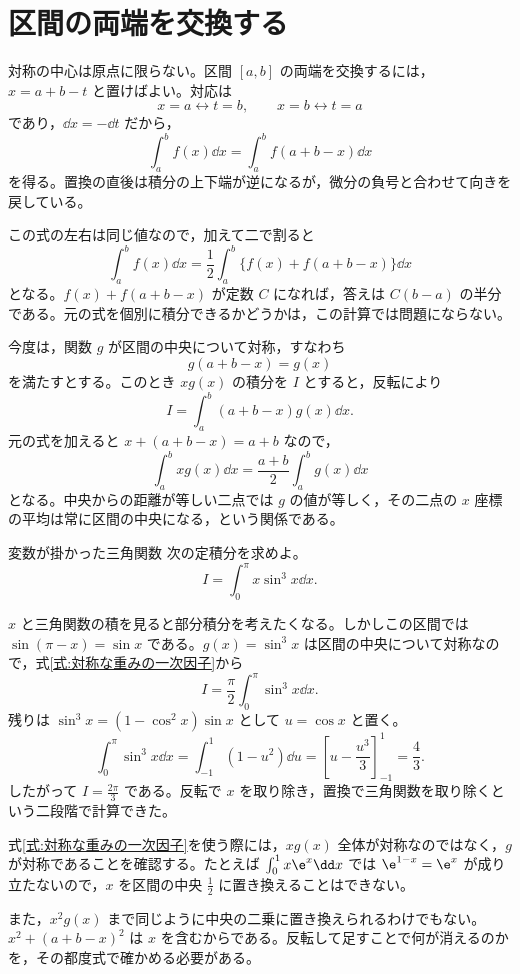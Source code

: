 \section{区間の両端を交換する}\label{節:区間の反転}

対称の中心は原点に限らない。区間 $[a,b]$ の両端を交換するには，$x=a+b-t$ と置けばよい。対応は
\[
x=a\longleftrightarrow t=b,\qquad
x=b\longleftrightarrow t=a
\]
であり，$\dd x=-\dd t$ だから，
\begin{equation}\label{式:区間反転}
\int_a^b f(x)\dd x=\int_a^b f(a+b-x)\dd x
\end{equation}
を得る。置換の直後は積分の上下端が逆になるが，微分の負号と合わせて向きを戻している。

この式の左右は同じ値なので，加えて二で割ると
\begin{equation}\label{式:反転平均}
\int_a^b f(x)\dd x
 =\frac12\int_a^b\{f(x)+f(a+b-x)\}\dd x
\end{equation}
となる。$f(x)+f(a+b-x)$ が定数 $C$ になれば，答えは $C(b-a)$ の半分である。元の式を個別に積分できるかどうかは，この計算では問題にならない。

今度は，関数 $g$ が区間の中央について対称，すなわち
\[
g(a+b-x)=g(x)
\]
を満たすとする。このとき $xg(x)$ の積分を $I$ とすると，反転により
\[
I=\int_a^b(a+b-x)g(x)\dd x.
\]
元の式を加えると $x+(a+b-x)=a+b$ なので，
\begin{equation}\label{式:対称な重みの一次因子}
\int_a^b xg(x)\dd x
 =\frac{a+b}{2}\int_a^b g(x)\dd x
\end{equation}
となる。中央からの距離が等しい二点では $g$ の値が等しく，その二点の $x$ 座標の平均は常に区間の中央になる，という関係である。

\begin{example}{変数が掛かった三角関数}
次の定積分を求めよ。
\[
I=\int_0^\pi x\sin^3x\dd x.
\]
\end{example}

$x$ と三角関数の積を見ると部分積分を考えたくなる。しかしこの区間では $\sin(\pi-x)=\sin x$ である。$g(x)=\sin^3x$ は区間の中央について対称なので，式\eqref{式:対称な重みの一次因子}から
\[
I=\frac{\pi}{2}\int_0^\pi\sin^3x\dd x.
\]
残りは $\sin^3x=(1-\cos^2x)\sin x$ として $u=\cos x$ と置く。
\[
\int_0^\pi\sin^3x\dd x
 =\int_{-1}^1(1-u^2)\dd u
 =\left[u-\frac{u^3}{3}\right]_{-1}^1
 =\frac43.
\]
したがって $I=\frac{2\pi}{3}$ である。反転で $x$ を取り除き，置換で三角関数を取り除くという二段階で計算できた。

式\eqref{式:対称な重みの一次因子}を使う際には，$xg(x)$ 全体が対称なのではなく，$g$ が対称であることを確認する。たとえば $\int_0^1 x\e^x\dd x$ では $\e^{1-x}=\e^x$ が成り立たないので，$x$ を区間の中央 $\frac12$ に置き換えることはできない。

また，$x^2g(x)$ まで同じように中央の二乗に置き換えられるわけでもない。$x^2+(a+b-x)^2$ は $x$ を含むからである。反転して足すことで何が消えるのかを，その都度式で確かめる必要がある。

